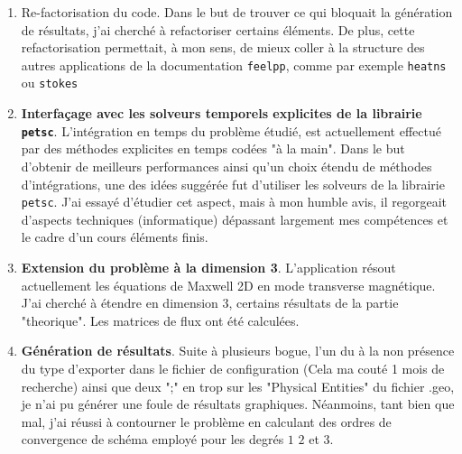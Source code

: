 \documentclass[a4paper,oneside,10pt]{report}
\begin{document}
\begin{enumerate}
\item Re-factorisation du code. Dans le but de trouver ce qui bloquait la génération de résultats, j'ai cherché à refactoriser certains éléments. De plus, cette refactorisation permettait, à mon sens, de mieux coller à la structure des autres applications de la documentation \texttt{feelpp}, comme par exemple \texttt{heatns} ou \texttt{stokes}
\item \textbf{Interfaçage avec les solveurs temporels explicites de la librairie \texttt{petsc}}. L'intégration en temps du problème étudié, est actuellement effectué par des méthodes explicites en temps codées "à la main".  Dans le but d'obtenir de meilleurs performances ainsi qu'un choix étendu de méthodes d'intégrations, une des idées suggérée fut d'utiliser les solveurs de la librairie \texttt{petsc}. J'ai essayé d'étudier cet aspect, mais à mon humble avis, il regorgeait d'aspects techniques (informatique) dépassant largement mes compétences et le cadre d'un cours éléments finis.
\item \textbf{Extension du problème à la dimension 3}. L'application résout actuellement les équations de Maxwell 2D en mode transverse magnétique. J'ai cherché à étendre en dimension 3, certains résultats de la partie "theorique". Les matrices de flux ont été calculées.
\item \textbf{Génération de résultats}. Suite à plusieurs bogue, l'un du à la non présence du type d'exporter dans le fichier de configuration (Cela ma couté 1 mois de recherche) ainsi que deux ";" en trop sur les "Physical Entities" du fichier .geo, je n'ai pu générer une foule de résultats graphiques. Néanmoins, tant bien que mal, j'ai réussi à contourner le problème en calculant des ordres de convergence de schéma employé pour les degrés $1$ $2$ et $3$.
\end{enumerate}

\begin{figure}[!h]
\begin{center}

  \begin{gantt}{10}{12}
    \begin{ganttitle}
    \end{ganttitle}
  \end{gantt}
\end{center}
\end{figure}
\end{document}
